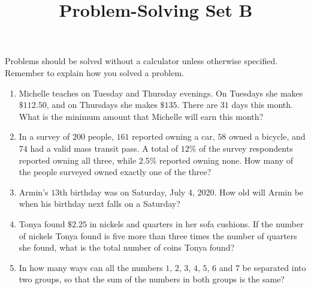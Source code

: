 \documentclass{article}
\title{Problem-Solving Set B}
\author{}
\date{}
\begin{document}
\maketitle
\noindent Problems should be solved without a calculator unless otherwise specified.
Remember to explain how you solved a problem.
\begin{multicols}{2}
    \begin{enumerate}
        \item Michelle teaches on Tuesday and Thursday evenings.
            On Tuesdays she makes $\$112.50$, and on Thursdays she makes $\$135$.
            There are $31$ days this month.
            What is the minimum amount that Michelle will earn this month?
            \vspace{3cm}
        \item In a survey of $200$ people, $161$ reported owning a car, $58$ owned a bicycle, and $74$ had a valid mass transit pass.
            A total of $12\%$ of the survey respondents reported owning all three, while $2.5\%$ reported owning none.
            How many of the people surveyed owned exactly one of the three?
            \vspace{3cm}
        \item Armin's $13$th birthday was on Saturday, July 4, 2020.
            How old will Armin be when his birthday next falls on a Saturday?
            \vspace{3cm}
        \item Tonya found $\$2.25$ in nickels and quarters in her sofa cushions.
            If the number of nickels Tonya found is five more than three times the number of quarters she found, what is the total number of coins Tonya found?
            \vspace{3cm}
        \item In how many ways can all the numbers $1$, $2$, $3$, $4$, $5$, $6$ and $7$ be separated into two groups, so that the sum of the numbers in both groups is the same?
            \vspace{3cm}
    \end{enumerate}
\end{multicols}
\end{document}
